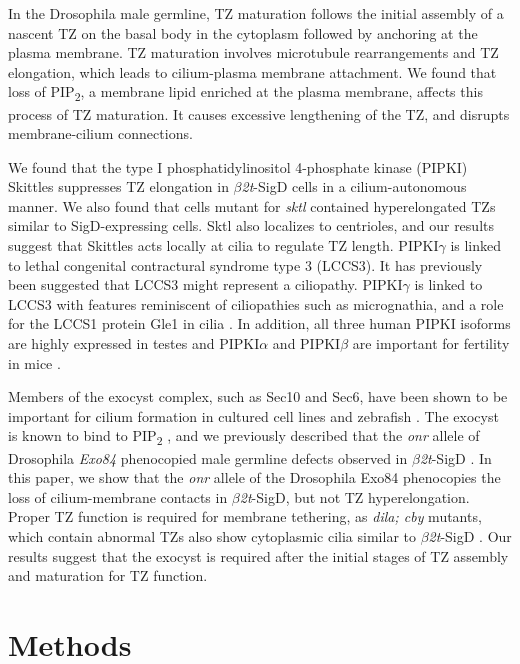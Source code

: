 \documentclass[12pt, twoside, letterpaper]{article}
\newcommand{\PIP}{PIP\textsubscript{2}}
\newcommand{\sigd}{$\beta$\textit{2t}-SigD}
\begin{document}
In the Drosophila male germline, TZ maturation follows the initial
assembly of a nascent TZ on the basal body in the cytoplasm
followed by anchoring at the plasma membrane.
TZ maturation involves microtubule rearrangements and TZ elongation,
which leads to cilium-plasma membrane attachment.
We found that loss of \PIP{}, a membrane lipid enriched at the plasma membrane,
affects this process of TZ maturation.
It causes excessive lengthening of the TZ,
and disrupts membrane-cilium connections.

We found that the type I phosphatidylinositol 4-phosphate kinase (PIPKI) Skittles
suppresses TZ elongation in \sigd{} cells in a cilium-autonomous
manner.
We also found that cells mutant for \textit{sktl} contained hyperelongated
TZs similar to SigD-expressing cells.
Sktl also localizes to centrioles,
and our results suggest that Skittles acts locally at cilia to
regulate TZ length.
PIPKI$\gamma$ is linked to lethal congenital contractural syndrome
type 3 (LCCS3).
It has previously been suggested that LCCS3 might represent a ciliopathy.
PIPKI$\gamma$ is linked to LCCS3 with features reminiscent
of ciliopathies such as micrognathia, and a role for the LCCS1 protein
Gle1 in cilia \citep{}.
In addition, all three human PIPKI isoforms are highly expressed in testes
and PIPKI$\alpha$ and PIPKI$\beta$ are important for fertility in mice
\citep{hasegawa2012phosphatidylinositol}.

Members of the exocyst complex, such as Sec10 and Sec6, have been shown
to be important for cilium formation in cultured cell lines and zebrafish
\citep{zuo2009exocyst, lobo2017exocyst, seixas2016arl13b}.
The exocyst is known to bind to \PIP{}
\citep{he2007exo70, zhang2008membrane}, and we previously described that
the \textit{onr} allele of Drosophila \textit{Exo84} phenocopied
male germline defects observed in \sigd{} \citep{fabian2010phosphatidylinositol}.
In this paper, we show that the \textit{onr} allele of the Drosophila Exo84
phenocopies the loss of cilium-membrane contacts in \sigd{},
but not TZ hyperelongation.
Proper TZ function is required for membrane tethering, as \textit{dila; cby}
mutants, which contain abnormal TZs also show cytoplasmic cilia similar to
\sigd{} \citep{vieillard2016transition}.
Our results suggest that the exocyst is required after the initial stages
of TZ assembly and maturation for TZ function.


\section{Methods}
\end{document}
